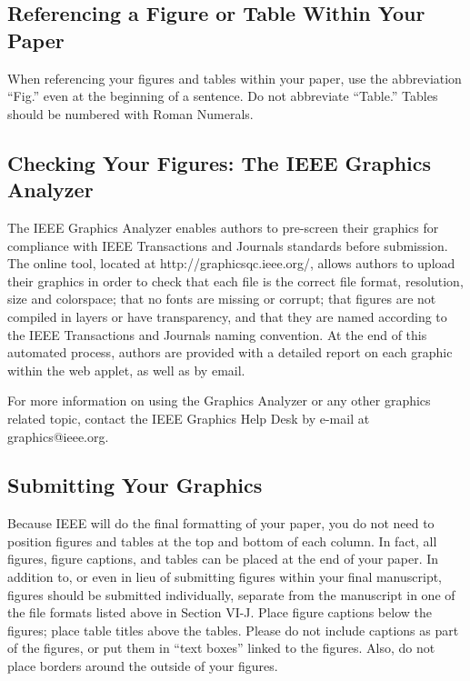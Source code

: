 \documentclass[journal]{IEEEtran}
\begin{document}
\subsection{Referencing a Figure or Table Within Your Paper}

When referencing your figures and tables within your paper, use the abbreviation ``Fig.'' even at the beginning of a sentence. Do not abbreviate ``Table.'' Tables should be numbered with Roman Numerals.


\subsection{Checking Your Figures: The IEEE Graphics Analyzer}


The IEEE Graphics Analyzer enables authors to pre-screen their graphics for compliance with IEEE Transactions and Journals standards before submission. The online tool, located at http://graphicsqc.ieee.org/, allows authors to upload their graphics in order to check that each file is the correct file format, resolution, size and colorspace; that no fonts are missing or corrupt; that figures are not compiled in layers or have transparency, and that they are named according to the IEEE Transactions and Journals naming convention. At the end of this automated process, authors are provided with a detailed report on each graphic within the web applet, as well as by email.

For more information on using the Graphics Analyzer or any other graphics related topic, contact the IEEE Graphics Help Desk by e-mail at graphics@ieee.org.

\subsection{Submitting Your Graphics}
Because IEEE will do the final formatting of your paper, 
you do not need to position figures and tables at the top and bottom of each column. In fact, all figures, figure captions, and tables can be placed at the end of your paper. In addition to, or even in lieu of submitting figures within your final manuscript, figures should be submitted individually, separate from the manuscript in one of the file formats listed above in Section VI-J. Place figure captions below the figures; place table titles above the tables. Please do not include captions as part of the figures, or put them in ``text boxes'' linked to the figures. Also, do not place borders around the outside of your figures.
\end{document}
